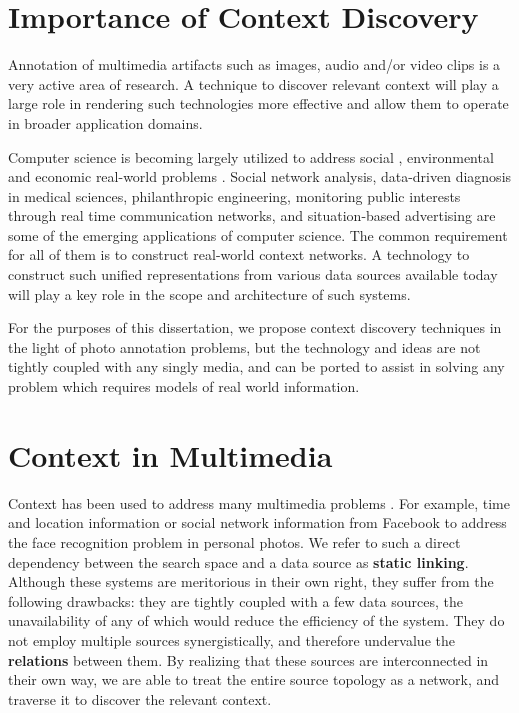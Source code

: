 \section{Importance of Context Discovery}

Annotation of multimedia artifacts such as images, audio and/or video clips \cite{galleguillos2010context, pang2011efficient, poppe2010survey, vinciarelli2009social, yang2010recognizing, zhao2003face, zeng2009survey} is a very active area of research. A technique to discover relevant context will play a large role in rendering such technologies more effective and allow them to operate in broader application domains.

Computer science is becoming largely utilized to address social \cite{sambasivan2010intermediated}, environmental \cite{ahrens2011data} and economic real-world problems \cite{chlistalla2011high}. Social network analysis, data-driven diagnosis in medical sciences, philanthropic engineering, monitoring public interests through real time communication networks, and situation-based advertising are some of the emerging applications of computer science. The common requirement for all of them is to construct real-world context networks. A technology to construct such unified representations from various data sources available today will play a key role in the scope and architecture of such systems.

For the purposes of this dissertation, we propose context discovery techniques in the light of photo annotation problems, but the technology and ideas are not tightly coupled with any singly media, and can be ported to assist in solving any problem which requires models of real world information.

\section{Context in Multimedia}

Context has been used to address many multimedia problems \cite{henter2012tag, li2012fusing, naaman2005identity, o2009context,stone2008autotagging}. For example, time and location information or social network information from Facebook to address the face recognition problem in personal photos. We refer to such a direct dependency between the search space and a data source as \textbf{static linking}. Although these systems are meritorious in their own right, they suffer from the following drawbacks: they are tightly coupled with a few data sources, the unavailability of any of which would reduce the efficiency of the system. They do not employ multiple sources synergistically, and therefore undervalue the \textbf{relations} between them. By realizing that these sources are interconnected in their own way, we are able to treat the entire source topology as a network, and traverse it to discover the relevant context.

